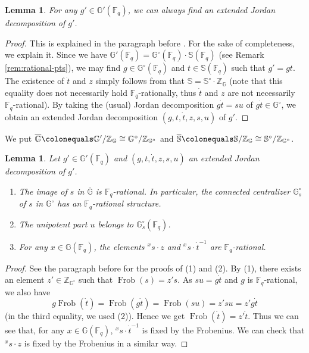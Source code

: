 \documentclass{amsart}
\newcommand{\F}{\mathbb{F}}
\newcommand{\bbS}{\mathbb{S}}
\newcommand{\bbG}{\mathbb{G}}
\newcommand{\bbZ}{\mathbb{Z}}
\DeclareMathOperator{\Frob}{Frob}
\theoremstyle{plain}
\newtheorem{lem}[thm]{Lemma}
\theoremstyle{definition}
\theoremstyle{remark}
\theoremstyle{theorem}
\begin{document}
\begin{lem}\label{lem:Jordan-exist}
For any $g'\in\bbG'(\F_{q})$, we can always find an extended Jordan decomposition of $g'$.
\end{lem}

\begin{proof}
This is explained in the paragraph before \cite[Proposition 3.4.24]{Kal19}.
For the sake of completeness, we explain it.
Since we have $\bbG'(\F_{q})=\bbG^{\circ}(\F_{q})\cdot\bbS(\F_{q})$ (see Remark \ref{rem:rational-pts}), we may find $g\in\bbG^{\circ}(\F_{q})$ and $t\in\bbS(\F_{q})$ such that $g'=gt$.
The existence of $\dot{t}$ and $z$ simply follows from that $\bbS=\bbS^{\circ}\cdot\bbZ_{\bbG}$ (note that this equality does not necessarily hold $\F_{q}$-rationally, thus $\dot{t}$ and $z$ are not necessarily $\F_{q}$-rational).
By taking the (usual) Jordan decomposition $g\dot{t}=su$ of $g\dot{t}\in\bbG^{\circ}$, we obtain an extended Jordan decomposition $(g,t,\dot{t},z,s,u)$ of $g'$.
\end{proof}

We put $\overline{\bbG}\colonequals \bbG'/\bbZ_{\bbG}\cong\bbG^{\circ}/\bbZ_{\bbG^{\circ}}$ and $\overline{\bbS}\colonequals \bbS/\bbZ_{\bbG}\cong\bbS^{\circ}/\bbZ_{\bbG^{\circ}}$.

\begin{lem}\label{lem:Jordan}
Let $g'\in\bbG'(\F_{q})$ and $(g,t,\dot{t},z,s,u)$ an extended Jordan decomposition of $g'$.
\begin{enumerate}
\item
The image of $s$ in $\overline{\bbG}$ is $\F_{q}$-rational.
In particular, the connected centralizer $\bbG_{s}^{\circ}$ of $s$ in $\bbG^{\circ}$ has an $\F_{q}$-rational structure.
\item
The unipotent part $u$ belongs to $\bbG_{s}^{\circ}(\F_{q})$.
\item
For any $x\in\bbG(\F_{q})$, the elements ${}^{x}s\cdot z$ and ${}^{x}s\cdot\dot{t}^{-1}$ are $\F_{q}$-rational.
\end{enumerate}
\end{lem}

\begin{proof}
See the paragraph before \cite[Proposition 3.4.24]{Kal19} for the proofs of (1) and (2).
By (1), there exists an element $z'\in \bbZ_{\bbG^{\circ}}$ such that $\Frob(s)=z's$.
As $su=g\dot{t}$ and $g$ is $\F_{q}$-rational, we also have
\[
g\Frob(\dot{t})
=\Frob(g\dot{t})
=\Frob(su)
=z'su
=z'g\dot{t}
\]
(in the third equality, we used (2)).
Hence we get $\Frob(\dot{t})=z'\dot{t}$.
Thus we can see that, for any $x\in\bbG(\F_{q})$, ${}^{x}s\cdot\dot{t}^{-1}$ is fixed by the Frobenius.
We can check that ${}^{x}s\cdot z$ is fixed by the Frobenius in a similar way.
\end{proof}
\end{document}
